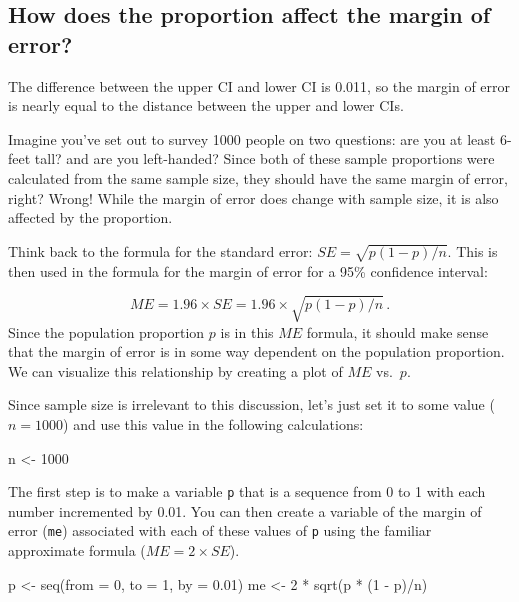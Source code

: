 \documentclass[
]{article}
\newenvironment{Shaded}{\begin{snugshade}}{\end{snugshade}}
\newcommand{\AttributeTok}[1]{\textcolor[rgb]{0.77,0.63,0.00}{#1}}
\newcommand{\DecValTok}[1]{\textcolor[rgb]{0.00,0.00,0.81}{#1}}
\newcommand{\FloatTok}[1]{\textcolor[rgb]{0.00,0.00,0.81}{#1}}
\newcommand{\FunctionTok}[1]{\textcolor[rgb]{0.00,0.00,0.00}{#1}}
\newcommand{\NormalTok}[1]{#1}
\newcommand{\OtherTok}[1]{\textcolor[rgb]{0.56,0.35,0.01}{#1}}
\newcommand{\SpecialCharTok}[1]{\textcolor[rgb]{0.00,0.00,0.00}{#1}}
\begin{document}
\hypertarget{how-does-the-proportion-affect-the-margin-of-error}{%
\subsection{How does the proportion affect the margin of
error?}\label{how-does-the-proportion-affect-the-margin-of-error}}

The difference between the upper CI and lower CI is 0.011, so the margin
of error is nearly equal to the distance between the upper and lower
CIs.

Imagine you've set out to survey 1000 people on two questions: are you
at least 6-feet tall? and are you left-handed? Since both of these
sample proportions were calculated from the same sample size, they
should have the same margin of error, right? Wrong! While the margin of
error does change with sample size, it is also affected by the
proportion.

Think back to the formula for the standard error:
\(SE = \sqrt{p(1-p)/n}\). This is then used in the formula for the
margin of error for a 95\% confidence interval:

\[
ME = 1.96\times SE = 1.96\times\sqrt{p(1-p)/n} \,.
\] Since the population proportion \(p\) is in this \(ME\) formula, it
should make sense that the margin of error is in some way dependent on
the population proportion. We can visualize this relationship by
creating a plot of \(ME\) vs.~\(p\).

Since sample size is irrelevant to this discussion, let's just set it to
some value (\(n = 1000\)) and use this value in the following
calculations:

\begin{Shaded}
\begin{Highlighting}[]
\NormalTok{n }\OtherTok{\textless{}{-}} \DecValTok{1000}
\end{Highlighting}
\end{Shaded}

The first step is to make a variable \texttt{p} that is a sequence from
0 to 1 with each number incremented by 0.01. You can then create a
variable of the margin of error (\texttt{me}) associated with each of
these values of \texttt{p} using the familiar approximate formula
(\(ME = 2 \times SE\)).

\begin{Shaded}
\begin{Highlighting}[]
\NormalTok{p }\OtherTok{\textless{}{-}} \FunctionTok{seq}\NormalTok{(}\AttributeTok{from =} \DecValTok{0}\NormalTok{, }\AttributeTok{to =} \DecValTok{1}\NormalTok{, }\AttributeTok{by =} \FloatTok{0.01}\NormalTok{)}
\NormalTok{me }\OtherTok{\textless{}{-}} \DecValTok{2} \SpecialCharTok{*} \FunctionTok{sqrt}\NormalTok{(p }\SpecialCharTok{*}\NormalTok{ (}\DecValTok{1} \SpecialCharTok{{-}}\NormalTok{ p)}\SpecialCharTok{/}\NormalTok{n)}
\end{Highlighting}
\end{Shaded}
\end{document}

